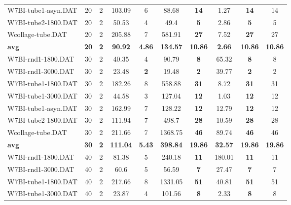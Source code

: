 \begin{table}[h]
\begin{tabular}{lccccccccc}
W7BI-tube1-asyn.DAT & 20 & 2 & 103.09 & 6 & 88.68 &  \textbf{14} &  \textcolor{blue2}{1.27} &  \textbf{14}  & 14 \\
W7BI-tube2-1800.DAT & 20 & 2 & 50.53 & 4 & 49.4 &  \textbf{5} &  \textcolor{blue2}{2.86} &  \textbf{5}  & 5 \\
Wcollage-tube.DAT & 20 & 2 & 205.88 & 7 & 581.91 &  \textbf{27} &  \textcolor{blue2}{7.52} &  \textbf{27}  & 27 \\
\cline{1-10} \textbf{avg} & \textbf{20} & \textbf{2} & \textbf{90.92} & \textbf{4.86} & \textbf{134.57} & \textbf{10.86} & \textbf{2.66} & \textbf{10.86} & \textbf{10.86} \\ \cline{1-10}
W7BI-rnd1-1800.DAT & 30 & 2 &  \textcolor{blue2}{40.35} & 4 & 90.79 &  \textbf{8} & 65.32 &  \textbf{8}  & 8 \\
W7BI-rnd1-3000.DAT & 30 & 2 & 23.48 &  \textbf{2} &  \textcolor{blue2}{19.48} &  \textbf{2} & 39.77 &  \textbf{2}  & 2 \\
W7BI-tube1-1800.DAT & 30 & 2 & 182.26 & 8 & 558.88 &  \textbf{31} &  \textcolor{blue2}{8.72} &  \textbf{31}  & 31 \\
W7BI-tube1-3000.DAT & 30 & 2 & 44.58 & 3 & 127.04 &  \textbf{12} &  \textcolor{blue2}{1.03} &  \textbf{12}  & 12 \\
W7BI-tube1-asyn.DAT & 30 & 2 & 162.99 & 7 & 128.22 &  \textbf{12} &  \textcolor{blue2}{12.79} &  \textbf{12}  & 12 \\
W7BI-tube2-1800.DAT & 30 & 2 & 111.94 & 7 & 498.7 &  \textbf{28} &  \textcolor{blue2}{10.59} &  \textbf{28}  & 28 \\
Wcollage-tube.DAT & 30 & 2 & 211.66 & 7 & 1368.75 &  \textbf{46} &  \textcolor{blue2}{89.74} &  \textbf{46}  & 46 \\
\cline{1-10} \textbf{avg} & \textbf{30} & \textbf{2} & \textbf{111.04} & \textbf{5.43} & \textbf{398.84} & \textbf{19.86} & \textbf{32.57} & \textbf{19.86} & \textbf{19.86} \\ \cline{1-10}
W7BI-rnd1-1800.DAT & 40 & 2 &  \textcolor{blue2}{81.38} & 5 & 240.18 &  \textbf{11} & 180.01 &  \textbf{11}  & 11 \\
W7BI-rnd1-3000.DAT & 40 & 2 & 60.6 & 5 & 56.59 &  \textbf{7} &  \textcolor{blue2}{27.47} &  \textbf{7}  & 7 \\
W7BI-tube1-1800.DAT & 40 & 2 & 217.66 & 8 & 1331.05 &  \textbf{51} &  \textcolor{blue2}{40.81} &  \textbf{51}  & 51 \\
W7BI-tube1-3000.DAT & 40 & 2 & 23.87 & 4 & 101.56 &  \textbf{8} &  \textcolor{blue2}{2.33} &  \textbf{8}  & 8 \\

\end{tabular}
\end{table}
